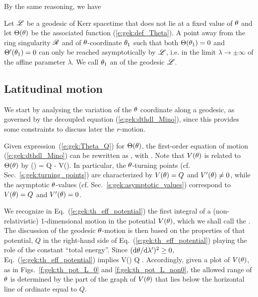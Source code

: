 By the same reasoning, we have
\begin{prop}
Let $\mathscr{L}$ be a geodesic of Kerr spacetime that does not lie at a fixed value of $\theta$ and let
$\Theta(\theta)$ be the associated function
(\ref{e:gek:def_Theta}).
A point away from the ring singularity $\mathscr{R}$ and of $\theta$-coordinate $\theta_1$
such that both $\Theta(\theta_1) = 0$ and $\Theta'(\theta_1) = 0$
can only be reached asymptotically by $\mathscr{L}$, i.e. in the limit
$\lambda\to \pm\infty$ of the affine parameter
$\lambda$. We call $\theta_1$ an
 of the geodesic $\mathscr{L}$.
\end{prop}



\subsection{Latitudinal motion} \label{s:gek:th_motion}

We start by analysing the variation of the $\theta$ coordinate along a geodesic,
as governed by the decoupled equation
(\ref{e:gek:dthdl_Mino}), since this provides some constraints
to discuss later the $r$-motion.

Given expression~(\ref{e:gek:Theta_Q}) for $\Theta(\theta)$,
the first-order equation of motion (\ref{e:gek:dthdl_Mino}) can be rewritten as
\be \label{e:gek:th_eff_potential}
    ,
\ee
with
\be \label{e:gek:def_V_th}
  .
\ee
Note that $V(\theta)$ is related to $\Theta(\theta)$ by
\be
    \Theta(\th) = Q - V(\th).
\ee
In particular, the $\theta$-turning points (cf. Sec.~\ref{s:gek:turning_points})
are characterized by
$V(\theta) = Q$ and $V'(\theta) \neq 0$, while the asymptotic $\theta$-values
(cf. Sec.~\ref{s:gek:asymptotic_values})
correspond to $V(\theta) = Q$ and $V'(\theta) = 0$.

We recognize in Eq.~(\ref{e:gek:th_eff_potential}) the first integral of a
(non-relativistic) 1-dimensional motion in the potential $V(\theta)$, which we
shall call the
.
The discussion of the geodesic $\theta$-motion
is then based on the properties of that potential, $Q$
in the right-hand side of Eq.~(\ref{e:gek:th_eff_potential})
playing the role of
the constant ``total energy''. Since $(\mathrm{d}\theta / \mathrm{d}\lambda')^2 \geq 0$,
Eq.~(\ref{e:gek:th_eff_potential})  implies
\be \label{e:gek:V_leq_Q}
    V(\th) \leq Q .
\ee
Accordingly, given a plot of $V(\theta)$, as in Figs.~\ref{f:gek:th_pot_L_0} and
\ref{f:gek:th_pot_L_non0}, the allowed range of $\theta$ is determined
by the part of the graph of $V(\theta)$ that lies below
the horizontal line of ordinate equal to $Q$.

